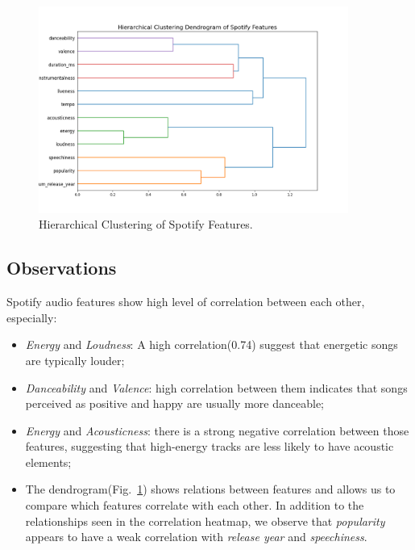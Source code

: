 \begin{center}
\begin{figure}[H]
  \centering
  \includegraphics[width=4in]{img/dendrogram_spotify_features.png}
  \caption{Hierarchical Clustering of Spotify Features.}
  \label{Figure:dendrogram_spotify_features}
\end{figure}
\end{center}

\subsection*{Observations}
Spotify audio features show high level of correlation between each other, especially:
\begin{itemize}
  \item \textit{Energy} and \textit{Loudness}: A high correlation(0.74) suggest
    that energetic songs are typically louder;
  \item \textit{Danceability} and \textit{Valence}: high correlation between
    them indicates that songs perceived as positive and happy are usually more
    danceable;
  \item \textit{Energy} and \textit{Acousticness}: there is a strong negative
    correlation between those features, suggesting that high-energy tracks are
    less likely to have acoustic elements;
  \item The dendrogram(Fig.~\ref{Figure:dendrogram_spotify_features}) shows relations
    between features and allows us to compare which features correlate with
    each other. In addition to the relationships seen in the correlation
    heatmap, we observe that \textit{popularity} appears to have a weak
    correlation with \textit{release year} and \textit{speechiness}.

\end{itemize}




